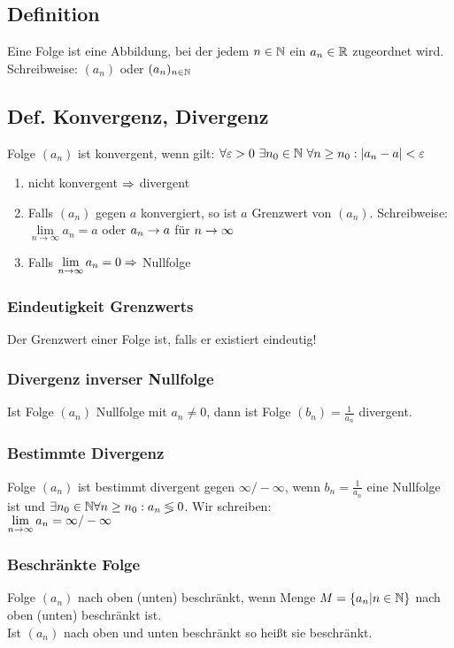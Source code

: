 \subsection*{Definition}
Eine Folge ist eine Abbildung, bei der jedem $n \in \mathbb N$ ein $a_n\in\mathbb R$ zugeordnet wird. Schreibweise: $(a_n)$ oder $(a_n)_{n \in \mathbb N}$
\subsection*{Def. Konvergenz, Divergenz}
Folge $(a_n)$ ist konvergent, wenn gilt:
$\forall \varepsilon > 0 \ \exists n_0 \in \mathbb N \ \forall n \geq n_0: |a_n -a | < \varepsilon$\\
\begin{enumerate}[label=\arabic*., noitemsep]
    \item nicht konvergent $\Rightarrow$ divergent
    \item Falls $(a_n)$ gegen $a$ konvergiert, so ist $a$ Grenzwert von $(a_n)$. Schreibweise: $\lim\limits_{n \rightarrow \infty} a_n = a$ oder $a_n \rightarrow a$ für $n \rightarrow \infty$
    \item Falls $\lim\limits_{n \rightarrow \infty} a_n = 0 \Rightarrow$ Nullfolge 
\end{enumerate}
\subsubsection*{Eindeutigkeit Grenzwerts}
Der Grenzwert einer Folge ist, falls er existiert eindeutig!
\subsubsection*{Divergenz inverser Nullfolge}
Ist Folge $(a_n)$ Nullfolge mit $a_n \neq 0$, dann ist Folge $(b_n) = \frac{1}{a_n}$ divergent.
\subsubsection*{Bestimmte Divergenz}
Folge $(a_n)$ ist bestimmt divergent gegen $\infty/-\infty$, wenn $b_n = \frac{1}{a_n}$ eine Nullfolge ist und $\exists n_0 \in \mathbb N \forall n \geq n_0: a_n \lessgtr 0$. Wir schreiben:\\
$\lim\limits_{n \rightarrow \infty} a_n = \infty/-\infty$
\subsubsection*{Beschränkte Folge}
Folge $(a_n)$ nach oben (unten) beschränkt, wenn Menge $M = \{a_n | n \in \mathbb N\}$ nach oben (unten) beschränkt ist.\\
Ist $(a_n)$ nach oben und unten beschränkt so heißt sie beschränkt.
